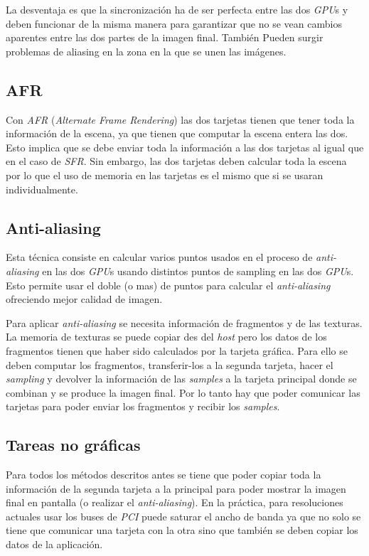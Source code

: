 \begin{pregunta}
La desventaja es que la sincronización ha de ser
perfecta entre las dos \emph{GPU}s y deben funcionar de la misma manera para
garantizar que no se vean cambios aparentes entre las dos partes de la imagen
final. También Pueden surgir problemas de aliasing en la zona en la que se unen
las imágenes.

\subsection*{AFR}

Con \emph{AFR} (\emph{Alternate Frame Rendering}) las dos tarjetas tienen que
tener toda la información de la escena, ya que tienen que computar la escena
entera las dos. Esto implica que se debe enviar toda la información a las dos
tarjetas al igual que en el caso de \emph{SFR}. Sin embargo, las dos tarjetas
deben calcular toda la escena por lo que el uso de memoria en las tarjetas es
el mismo que si se usaran individualmente.

\subsection*{Anti-aliasing}

Esta técnica consiste en calcular varios puntos usados en el proceso de
\emph{anti-aliasing} en las dos \emph{GPU}s usando distintos puntos
de sampling en las dos \emph{GPU}s. Esto permite usar el doble (o mas) de puntos
para calcular el \emph{anti-aliasing} ofreciendo mejor calidad de imagen.

Para aplicar \emph{anti-aliasing} se necesita información de fragmentos y de las
texturas. La memoria de texturas se puede copiar des del \emph{host} pero los
datos de los fragmentos tienen que haber sido calculados por la tarjeta gráfica.
Para ello se deben computar los fragmentos, transferir-los a la segunda tarjeta,
hacer el \emph{sampling} y devolver la información de las \emph{samples} a la
tarjeta principal donde se combinan y se produce la imagen final. Por lo tanto
hay que poder comunicar las tarjetas para poder enviar los fragmentos y recibir
los \emph{samples}.

\subsection*{Tareas no gráficas}

Para todos los métodos descritos antes se tiene que poder copiar toda la
información de la segunda tarjeta a la principal para poder mostrar la imagen
final en pantalla (o realizar el \emph{anti-aliasing}). En la práctica, para
resoluciones actuales usar los buses de \emph{PCI} puede saturar el ancho de
banda ya que no solo se tiene que comunicar una tarjeta con la otra sino que
también se deben copiar los datos de la aplicación.


\end{pregunta}
